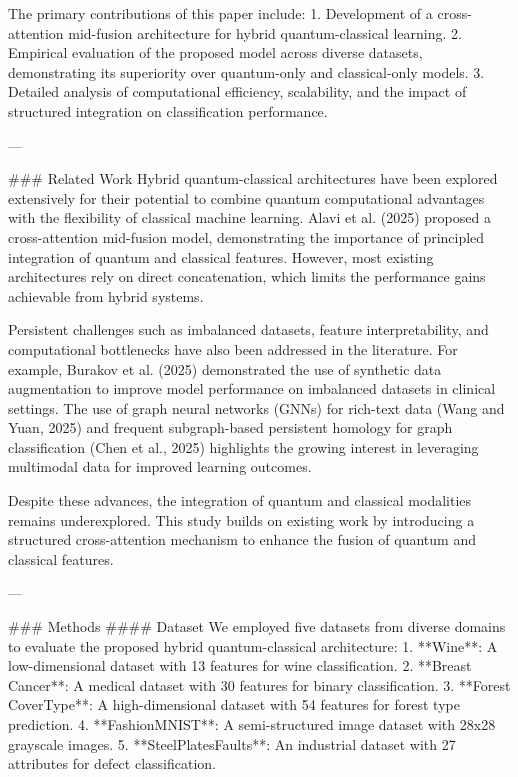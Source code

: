 The primary contributions of this paper include:
1. Development of a cross-attention mid-fusion architecture for hybrid quantum-classical learning.
2. Empirical evaluation of the proposed model across diverse datasets, demonstrating its superiority over quantum-only and classical-only models.
3. Detailed analysis of computational efficiency, scalability, and the impact of structured integration on classification performance.

---

### Related Work
Hybrid quantum-classical architectures have been explored extensively for their potential to combine quantum computational advantages with the flexibility of classical machine learning. Alavi et al. (2025) proposed a cross-attention mid-fusion model, demonstrating the importance of principled integration of quantum and classical features. However, most existing architectures rely on direct concatenation, which limits the performance gains achievable from hybrid systems. 

Persistent challenges such as imbalanced datasets, feature interpretability, and computational bottlenecks have also been addressed in the literature. For example, Burakov et al. (2025) demonstrated the use of synthetic data augmentation to improve model performance on imbalanced datasets in clinical settings. The use of graph neural networks (GNNs) for rich-text data (Wang and Yuan, 2025) and frequent subgraph-based persistent homology for graph classification (Chen et al., 2025) highlights the growing interest in leveraging multimodal data for improved learning outcomes.

Despite these advances, the integration of quantum and classical modalities remains underexplored. This study builds on existing work by introducing a structured cross-attention mechanism to enhance the fusion of quantum and classical features.

---

### Methods
#### Dataset
We employed five datasets from diverse domains to evaluate the proposed hybrid quantum-classical architecture:
1. **Wine**: A low-dimensional dataset with 13 features for wine classification.
2. **Breast Cancer**: A medical dataset with 30 features for binary classification.
3. **Forest CoverType**: A high-dimensional dataset with 54 features for forest type prediction.
4. **FashionMNIST**: A semi-structured image dataset with 28x28 grayscale images.
5. **SteelPlatesFaults**: An industrial dataset with 27 attributes for defect classification.


